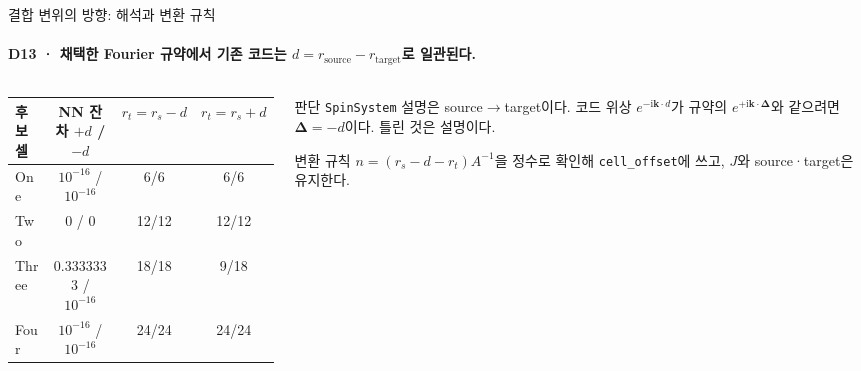 \begin{frame}[label=displacement-resolution]{결합 변위의 방향: 해석과 변환 규칙}
  \framesubtitle{D13 · 채택한 Fourier 규약에서 기존 코드는 $d=r_{\mathrm{source}}-r_{\mathrm{target}}$로 일관된다.}
  \begin{columns}[T,onlytextwidth]
    \begin{column}{0.54\textwidth}
      \small
      \begin{tabular}{@{}lccc@{}}
        \toprule
        후보 셀 & NN 잔차 $+d$ / $-d$ & $r_t=r_s-d$ & $r_t=r_s+d$ \\
        \midrule
        One & $10^{-16}$ / $10^{-16}$ & 6/6 & 6/6 \\
        Two & 0 / 0 & 12/12 & 12/12 \\
        Three & 0.3333333 / $10^{-16}$ & 18/18 & 9/18 \\
        Four & $10^{-16}$ / $10^{-16}$ & 24/24 & 24/24 \\
        \bottomrule
      \end{tabular}\\[0.4em]
    \end{column}
    \begin{column}{0.42\textwidth}
      \begin{block}{판단}
        \texttt{SpinSystem} 설명은 source$\to$target이다. 코드 위상 $e^{-\mathrm i\mathbf k\cdot d}$가
        규약의 $e^{+\mathrm i\mathbf k\cdot\symbf\Delta}$와 같으려면 $\symbf\Delta=-d$이다.
        틀린 것은 설명이다.
      \end{block}
      \begin{block}{변환 규칙}
        $n=(r_s-d-r_t)A^{-1}$을 정수로 확인해 \texttt{cell\_offset}에 쓰고, $J$와 source·target은 유지한다.
      \end{block}
    \end{column}
  \end{columns}
  \par\smallskip
\end{frame}

